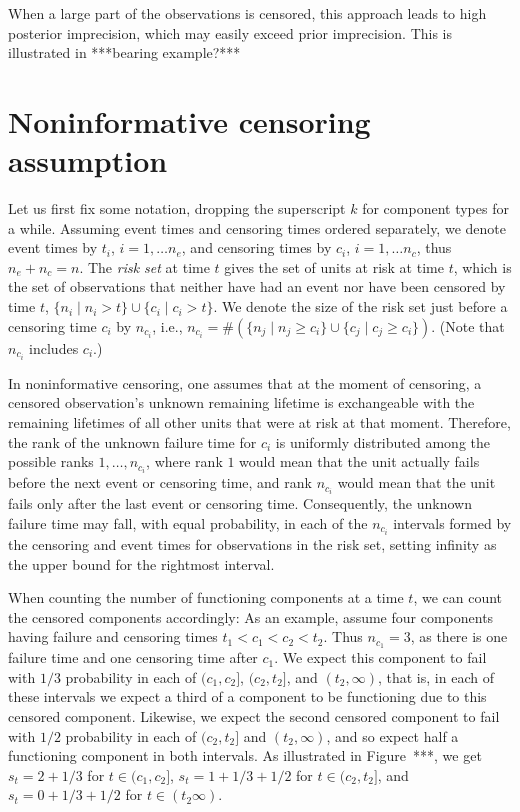 \documentclass[12pt, a4paper]{elsarticle}
\begin{document}
When a large part of the observations is censored,
this approach leads to high posterior imprecision,
which may easily exceed prior imprecision.
This is illustrated in ***bearing example?***


\section{Noninformative censoring assumption}

Let us first fix some notation, dropping the superscript $k$ for component types for a while.
Assuming event times and censoring times ordered separately,
we denote event times by $t_i$, $i=1, \ldots n_e$,
and censoring times by $c_i$, $i=1, \ldots n_c$,
thus $n_e + n_c = n$.
The \emph{risk set} at time $t$ gives the set of units at risk at time $t$,
which is the set of observations that neither have had an event nor have been censored by time $t$,
$\{n_i \mid n_i > t \} \cup \{ c_i \mid c_i > t \}$.
We denote the size of the risk set just before a censoring time $c_i$ by $n_{c_i}$,
i.e., $n_{c_i} = \#(\{ n_j \mid n_j \ge c_i \} \cup \{ c_j \mid c_j \ge c_i \})$.
(Note that $n_{c_i}$ includes $c_i$.)

In noninformative censoring, one assumes that
at the moment of censoring, a censored observation's unknown remaining lifetime
is exchangeable with the remaining lifetimes of all other units that were at risk at that moment. %
Therefore, the rank of the unknown failure time for $c_i$ is uniformly distributed among the possible ranks $1, \ldots, n_{c_i}$,
where rank $1$ would mean that the unit actually fails before the next event or censoring time,
and rank $n_{c_i}$ would mean that the unit fails only after the last event or censoring time.
Consequently, the unknown failure time may fall, with equal probability,
in each of the $n_{c_i}$ intervals formed by the censoring and event times for observations in the risk set,
setting infinity as the upper bound for the rightmost interval.

When counting the number of functioning components at a time $t$,
we can count the censored components accordingly:
As an example, assume four components having failure and censoring times $t_1 < c_1 < c_2 < t_2$.
Thus $n_{c_1} = 3$, as there is one failure time and one censoring time after $c_1$.
We expect this component to fail with $1/3$ probability in each of
$(c_1, c_2]$, $(c_2, t_2]$, and $(t_2, \infty)$,
that is, in each of these intervals we expect a third of a component to be functioning
due to this censored component.
Likewise, we expect the second censored component to fail with $1/2$ probability
in each of $(c_2, t_2]$ and $(t_2, \infty)$,
and so expect half a functioning component in both intervals.
%
As illustrated in Figure~***,
we get $s_t = 2 + 1/3$ for $t \in (c_1, c_2]$,
$s_t = 1 + 1/3 + 1/2$ for $t \in (c_2, t_2]$,
and $s_t = 0 + 1/3 + 1/2$ for $t \in (t_2 \infty)$.
\end{document}
